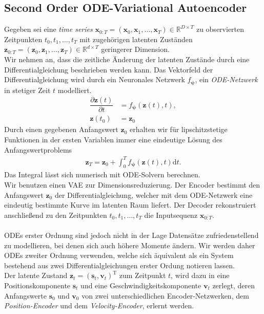 \documentclass[12pt]{article}
\begin{document}
	\subsection[ODE$^2$VAE]{Second Order ODE-Variational Autoencoder}
	Gegeben sei eine \emph{time series} $\mathbf{x}_{0:T}=(\mathbf x_{0}, \mathbf x_{1}, \ldots,\mathbf x_{T})\in \mathbb{R}^{D\times T}$ zu observierten Zeitpunkten $t_{0}, t_{1},\ldots,t_{T}$ mit zugehörigen latenten Zuständen $\mathbf z_{0:T}=(\mathbf z_{0}, \mathbf z_{1}, \ldots, \mathbf z_{T})\in \mathbb{R}^{d\times T}$ geringerer Dimension. \\
	Wir nehmen an, dass die zeitliche Änderung der latenten Zustände durch eine Differentialgleichung beschrieben werden kann. Das Vektorfeld der Differentialgleichung wird durch ein Neuronales Netzwerk $f_{\boldsymbol{\psi}}$, ein \emph{ODE-Netzwerk} in stetiger Zeit $t$ modelliert.
	\begin{align*}
	\dfrac{\partial \mathbf{z}(t)}{\partial t}&=f_{\boldsymbol{\psi}}(\mathbf{z}(t),t), \\
	\mathbf z(t_{0})&=\mathbf z_{0}
	\end{align*}
	Durch einen gegebenen Anfangswert $\mathbf z_{0}$ erhalten wir für lipschitzstetige Funktionen in der ersten Variablen immer eine eindeutige Lösung des Anfangswertproblems
	\begin{align*}
	\mathbf z_{T}=\mathbf z_{0} +\int_{0}^{T} f_{\boldsymbol{\psi}}(\mathbf{z}(t),t) \mathrm{d}t.
	\end{align*}
	Das Integral lässt sich numerisch mit ODE-Solvern berechnen. \\
	Wir benutzen einen VAE zur Dimensionsreduzierung. Der Encoder bestimmt den Anfangswert $\mathbf z_{0}$ der Differentialgleichung, welcher mit dem ODE-Netzwerk eine eindeutig bestimmte Kurve im latenten Raum liefert. Der Decoder rekonstruiert anschließend zu den Zeitpunkten $t_{0}, t_{1},\ldots,t_{T}$ die Inputsequenz $\mathbf x_{0:T}$. \\ \\
	ODEs erster Ordnung sind jedoch nicht in der Lage Datensätze zufriedenstellend zu modellieren, bei denen sich auch höhere Momente ändern.
	Wir werden daher ODEs zweiter Ordnung verwenden, welche sich äquivalent als ein System bestehend aus zwei Differenti\nolinebreak algleichungen erster Ordung notieren lassen.\\ Der latente Zustand $\mathbf z_{t}=(\mathbf s_{t}, \mathbf v_{t})^{\mathrm{T}}$ zum Zeitpunkt $t$, wird dazu in eine Positionskomponente $\mathbf s_{t}$ und eine Geschwindigkeitskomponente $\mathbf v_{t}$ zerlegt, deren Anfangswerte $\mathbf s_{0}$ und $\mathbf v_{0}$ von zwei unterschiedlichen Encoder-Netzwerken, dem \emph{Position-Encoder} und dem \emph{Velocity-Encoder}, erlernt werden.\\
\end{document}
